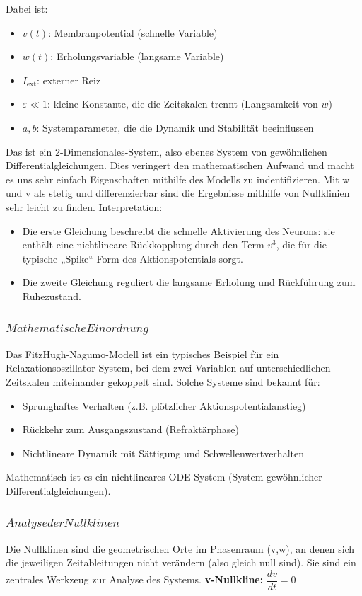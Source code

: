 \begin{refsection}
Dabei ist:

\begin{itemize}
	\item $v(t)$: Membranpotential (schnelle Variable)
	\item $w(t)$: Erholungsvariable (langsame Variable)
	\item $I_{\text{ext}}$: externer Reiz
	\item $\varepsilon \ll 1$: kleine Konstante, die die Zeitskalen trennt (Langsamkeit von $w$)
	\item $a, b$: Systemparameter, die die Dynamik und Stabilität beeinflussen
\end{itemize}
Das ist ein 2-Dimensionales-System, also ebenes System von gewöhnlichen Differentialgleichungen. Dies veringert den mathematischen Aufwand und macht es uns sehr einfach Eigenschaften mithilfe des Modells zu indentifizieren.
Mit w und v als stetig und differenzierbar sind die Ergebnisse mithilfe von Nullklinien sehr leicht zu finden.
Interpretation:
\begin{itemize}
\item Die erste Gleichung beschreibt die schnelle Aktivierung des Neurons: sie enthält eine nichtlineare Rückkopplung durch den Term $v^3$, die für die typische „Spike“-Form des Aktionspotentials sorgt.
\item Die zweite Gleichung reguliert die langsame Erholung und Rückführung zum Ruhezustand.
\end{itemize}
\subsubsection{$Mathematische Einordnung$}
Das FitzHugh-Nagumo-Modell ist ein typisches Beispiel für ein Relaxationsoszillator-System, bei dem zwei Variablen auf unterschiedlichen Zeitskalen miteinander gekoppelt sind. Solche Systeme sind bekannt für:
\begin{itemize}
	\item Sprunghaftes Verhalten (z.B. plötzlicher Aktionspotentialanstieg)
	\item Rückkehr zum Ausgangszustand (Refraktärphase)
	\item Nichtlineare Dynamik mit Sättigung und Schwellenwertverhalten
\end{itemize}
Mathematisch ist es ein nichtlineares ODE-System (System gewöhnlicher Differentialgleichungen).
\subsubsection{$Analyse der Nullklinen$}
Die Nullklinen sind die geometrischen Orte im Phasenraum (v,w), an denen sich die jeweiligen Zeitableitungen nicht verändern (also gleich null sind). Sie sind ein zentrales Werkzeug zur Analyse des Systems.
\textbf{v-Nullkline:} $\dfrac{dv}{dt} = 0$


\end{refsection}
